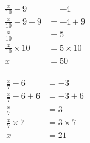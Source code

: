\documentclass[12pt]{article}
\newcounter{minipagecount}
\begin{document}
\begin{multicols}{2}
\begin{minipage}[t]{0.45\textwidth} %
    \vspace{-26pt}  %
    \raggedright %
    \begin{align*} %
        \frac{x}{10} - 9 &= -4\\
        \frac{x}{10} - 9 + 9 &= -4 + 9\\
        \frac{x}{10} &= 5\\
        \frac{x}{10} \times10 &= 5 \times10\\
        x &= 50\\
    \end{align*}
\end{minipage} %
\noindent{(\theminipagecount)}\hspace{0.1mm} %
\begin{minipage}[t]{0.45\textwidth} %
    \vspace{-26pt}  %
    \raggedright %
    \begin{align*} %
        \frac{x}{7} - 6 &= -3\\
        \frac{x}{7} - 6 + 6 &= -3 + 6\\
        \frac{x}{7} &= 3\\
        \frac{x}{7} \times7 &= 3 \times7\\
        x &= 21\\
    \end{align*}
\end{minipage}\columnbreak

\end{multicols}
\end{document}
